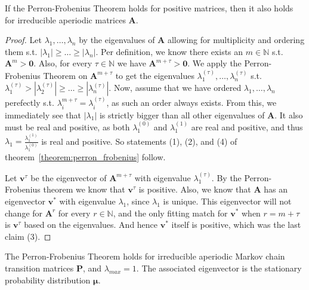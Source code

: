 \documentclass[../../main.tex]{subfiles}
\begin{document}
\begin{lemma}
    If the Perron-Frobenius Theorem holds for positive matrices, then it also holds for irreducible aperiodic matrices $\bm{A}$.
\end{lemma}
\vspace{-2.5em}
\begin{proof}
    Let $\lambda_1, \dots, \lambda_n$ by the eigenvalues of $\bm{A}$ allowing for multiplicity and ordering them s.t. $|\lambda_1| \geq \dots \geq |\lambda_n|$. Per definition, we know there exists an $m \in \mathbb{N}$ s.t. $\bm{A}^m > \bm{0}$. Also, for every $\tau \in \mathbb{N}$ we have $\bm{A}^{m + \tau} > \bm{0}$. We apply the Perron-Frobenius Theorem on $\bm{A}^{m + \tau}$ to get the eigenvalues $\lambda_1^{(\tau)}, \dots, \lambda_n^{(\tau)}$ s.t. $\lambda_1^{(\tau)} > |\lambda_2^{(\tau)}| \geq \dots \geq |\lambda_n^{(\tau)}|$. Now, assume that we have ordered $\lambda_1, \dots, \lambda_n$ perefectly s.t. $\lambda_i^{m + \tau} = \lambda_i^{(\tau)}$, as such an order always exists. From this, we immediately see that $|\lambda_1|$ is strictly bigger than all other eigenvalues of $\bm{A}$. It also must be real and positive, as both $\lambda_1^{(0)}$ and $\lambda_1^{(1)}$ are real and positive, and thus $\lambda_1 = \frac{\lambda_1^{(1)}}{\lambda_1^{(0)}}$ is real and positive. So statements (1), (2), and (4) of theorem~\ref{theorem:perron_frobenius} follow.

    Let $\bm{v}^{\tau}$ be the eigenvector of $\bm{A}^{m + \tau}$ with eigenvalue $\lambda_1^{(\tau)}$. By the Perron-Frobenius theorem we know that $\bm{v}^{\tau}$ is positive. Also, we know that $\bm{A}$ has an eigenvector $\bm{v}^*$ with eigenvalue $\lambda_1$, since $\lambda_1$ is unique. This eigenvector will not change for $\bm{A}^r$ for every $r \in \mathbb{N}$, and the only fitting match for $\bm{v}^*$ when $r = m + \tau$ is $\bm{v}^{\tau}$ based on the eigenvalues. And hence $\bm{v}^*$ itself is positive, which was the last claim (3).
\end{proof}

\begin{corollary}
    The Perron-Frobenius Theorem holds for irreducible aperiodic Markov chain transition matrices $\bm{P}$, and $\lambda_{max} = 1$. The associated eigenvector is the stationary probability distribution $\bm{\mu}$.
\end{corollary}
\end{document}
